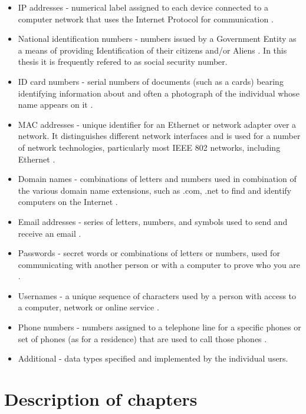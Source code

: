 \documentclass[a4paper,twoside,12pt]{book}
\begin{document}
\begin{itemize}
   \item IP addresses - numerical label assigned to each device connected to a computer network that uses the Internet Protocol for communication \cite{bib:articleIP}.
   \item National identification numbers - numbers issued by a Government Entity as a means of providing Identification of their citizens and/or Aliens \cite{bib:internetIdentityNumber}.
   In this thesis it is frequently refered to as social security number.
   \item ID card numbers - serial numbers of documents (such as a cards) bearing identifying information about and often a photograph of the individual whose 
   name appears on it \cite{bib:internetID}. 
   \item MAC addresses - unique identifier for an Ethernet or network adapter over a network. It distinguishes different network interfaces and is used for a number 
   of network technologies, particularly most IEEE 802 networks, including Ethernet \cite{bib:internetMAC}.
   \item Domain names - combinations of letters and numbers used in combination of the various domain name extensions, such as .com, .net to find and 
   identify computers on the Internet \cite{bib:internetDomain}.
   \item Email addresses - series of letters, numbers, and symbols used to send and receive an email \cite{bib:internetEmail}.
   \item Passwords - secret words or combinations of letters or numbers, used for communicating with another person or with a computer to prove who you are \cite{bib:internetPassword}.
   \item Usernames - a unique sequence of characters used by a person with access to a computer, network or online service \cite{bib:internetUsername}.
   \item Phone numbers - numbers assigned to a telephone line for a specific phones or set of phones (as for a residence) that are used to call those phones \cite{bib:internetPhone}.
   \item Additional - data types specified and implemented by the individual users.
\end{itemize}


\section{Description of chapters}
\end{document}
